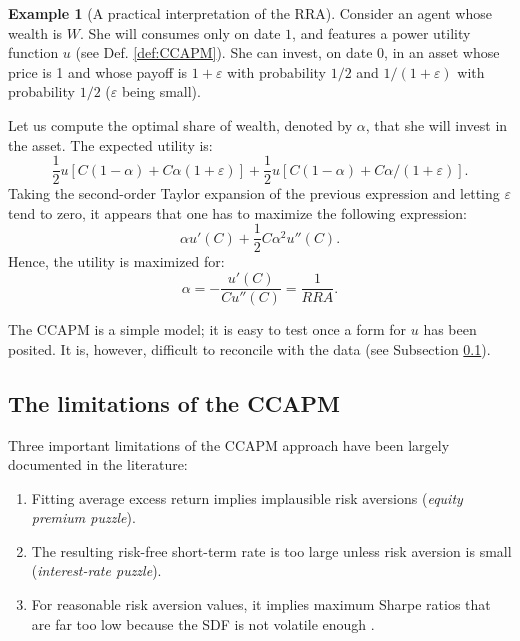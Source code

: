 \documentclass[
  12pt,
]{book}
\providecommand{\tightlist}{%
  \setlength{\itemsep}{0pt}\setlength{\parskip}{0pt}}
\theoremstyle{definition}
\theoremstyle{definition}
\newtheorem{example}{Example}[chapter]
\theoremstyle{definition}
\theoremstyle{definition}
\theoremstyle{remark}
\begin{document}
\begin{example}[A practical interpretation of the RRA]
\protect\hypertarget{exm:CCAPMRRAinvestment}{}\label{exm:CCAPMRRAinvestment}Consider an agent whose wealth is \(W\). She will consumes only on date \(1\), and features a power utility function \(u\) (see Def. \ref{def:CCAPM}). She can invest, on date \(0\), in an asset whose price is 1 and whose payoff is \(1+\varepsilon\) with probability \(1/2\) and \(1/(1+\varepsilon)\) with probability \(1/2\) (\(\varepsilon\) being small).

Let us compute the optimal share of wealth, denoted by \(\alpha\), that she will invest in the asset. The expected utility is:
\[
\frac{1}{2}u\left[C(1-\alpha)+C\alpha(1+\varepsilon)\right] + \frac{1}{2}u\left[C(1-\alpha)+C\alpha/(1+\varepsilon)\right].
\]
Taking the second-order Taylor expansion of the previous expression and letting \(\varepsilon\) tend to zero, it appears that one has to maximize the following expression:
\[
\alpha u'(C) + \frac{1}{2}C \alpha^2 u''(C).
\]
Hence, the utility is maximized for:
\[
\alpha = - \frac{u'(C)}{C u''(C)} = \frac{1}{RRA}.
\]
\end{example}

The CCAPM is a simple model; it is easy to test once a form for \(u\) has been posited. It is, however, difficult to reconcile with the data (see Subsection \ref{limitationsCCAPM}).

\hypertarget{limitationsCCAPM}{%
\subsection{The limitations of the CCAPM}\label{limitationsCCAPM}}

Three important limitations of the CCAPM approach have been largely documented in the literature:

\begin{enumerate}
\def\labelenumi{\alph{enumi}.}
\tightlist
\item
  Fitting average excess return implies implausible risk aversions (\emph{equity premium puzzle}).
\item
  The resulting risk-free short-term rate is too large unless risk aversion is small (\emph{interest-rate puzzle}).
\item
  For reasonable risk aversion values, it implies maximum Sharpe ratios that are far too low because the SDF is not volatile enough \citep{Hansen_Jagannathan_1991}.
\end{enumerate}
\end{document}
